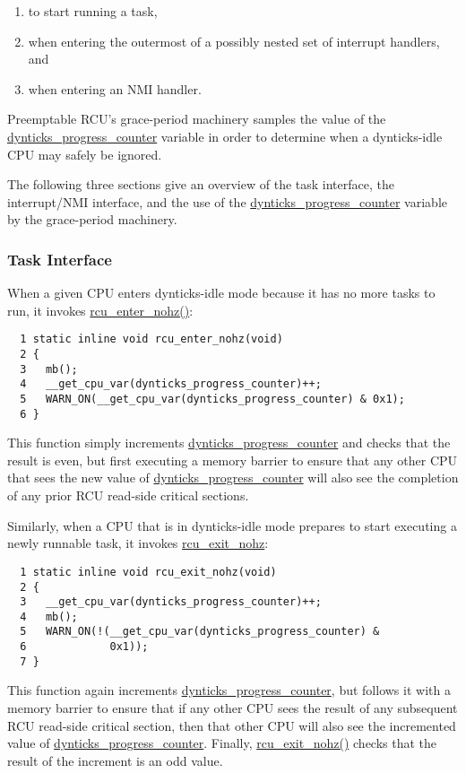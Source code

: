 \begin{enumerate}
\item	to start running a task,
\item	when entering the outermost of a possibly nested set of interrupt
	handlers, and
\item	when entering an NMI handler.
\end{enumerate}

Preemptable RCU's grace-period machinery samples the value of
the \url{dynticks_progress_counter} variable in order to
determine when a dynticks-idle CPU may safely be ignored.

The following three sections give an overview of the task
interface, the interrupt/NMI interface, and the use of
the \url{dynticks_progress_counter} variable by the
grace-period machinery.

\subsubsection{Task Interface}
\label{app:formal:Task Interface}

When a given CPU enters dynticks-idle mode because it has no more
tasks to run, it invokes \url{rcu_enter_nohz()}:

{ \scriptsize
\begin{verbatim}
  1 static inline void rcu_enter_nohz(void)
  2 {
  3   mb();
  4   __get_cpu_var(dynticks_progress_counter)++;
  5   WARN_ON(__get_cpu_var(dynticks_progress_counter) & 0x1);
  6 }
\end{verbatim}
}

This function simply increments \url{dynticks_progress_counter} and
checks that the result is even, but first executing a memory barrier
to ensure that any other CPU that sees the new value of
\url{dynticks_progress_counter} will also see the completion
of any prior RCU read-side critical sections.

Similarly, when a CPU that is in dynticks-idle mode prepares to
start executing a newly runnable task, it invokes
\url{rcu_exit_nohz}:

{ \scriptsize
\begin{verbatim}
  1 static inline void rcu_exit_nohz(void)
  2 {
  3   __get_cpu_var(dynticks_progress_counter)++;
  4   mb();
  5   WARN_ON(!(__get_cpu_var(dynticks_progress_counter) &
  6             0x1));
  7 }
\end{verbatim}
}

This function again increments \url{dynticks_progress_counter},
but follows it with a memory barrier to ensure that if any other CPU
sees the result of any subsequent RCU read-side critical section,
then that other CPU will also see the incremented value of
\url{dynticks_progress_counter}.
Finally, \url{rcu_exit_nohz()} checks that the result of the
increment is an odd value.


